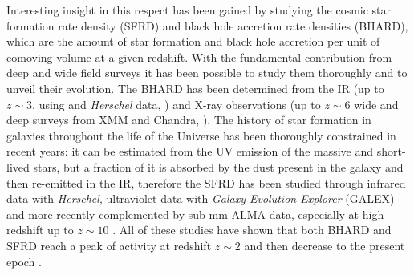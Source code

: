 
Interesting insight in this respect has been gained by studying the cosmic star formation rate density (SFRD) and black hole accretion rate densities (BHARD), which are the amount of star formation and black hole accretion per unit of comoving volume at a given redshift. With the fundamental contribution from deep and wide field surveys it has been possible to study them thoroughly and to unveil their evolution.
The BHARD has been determined from the IR (up to $z\sim3$, using and \emph{Herschel} data, \citet{2014MNRAS.439.2736D}) and X-ray observations (up to $z\sim 6$ wide and deep surveys from XMM and Chandra, \citet{2018MNRAS.473.2378V}). 
The history of star formation in galaxies throughout the life of the Universe has been thoroughly constrained in recent years: it can be estimated from the UV emission of the massive and short-lived stars, but a fraction of it is absorbed by the dust present in the galaxy and then re-emitted in the IR, therefore the SFRD has been studied through infrared data with \emph{Herschel}, ultraviolet data with \emph{Galaxy Evolution Explorer} (GALEX) \citep[see][for a review]{2014ARA&A..52..415M} and more recently complemented by sub-mm ALMA data, especially at high redshift up to $z\sim10$ \citep{2020ApJ...902..112B,2020A&A...643A...8G}. %
All of these studies have shown that both BHARD and SFRD reach a peak of activity at redshift $z\sim2$ and then decrease to the present epoch \citep{1998MNRAS.293L..49B}.

